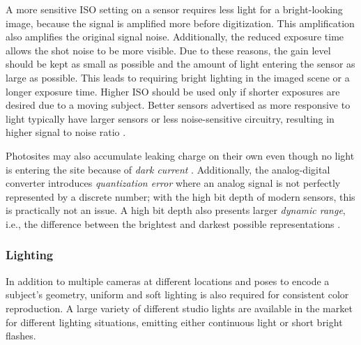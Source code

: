 A more sensitive ISO setting on a sensor requires less light for a bright-looking image, because the signal is amplified more before digitization.
This amplification also amplifies the original signal noise.
Additionally, the reduced exposure time allows the shot noise to be more visible.
Due to these reasons, the gain level should be kept as small as possible and the amount of light entering the sensor as large as possible.
This leads to requiring bright lighting in the imaged scene or a longer exposure time.
Higher ISO should be used only if shorter exposures are desired due to a moving subject.
Better sensors advertised as more responsive to light typically have larger sensors or less noise-sensitive circuitry, resulting in higher signal to noise ratio \cite{el2005cmos}.

Photosites may also accumulate leaking charge on their own even though no light is entering the site because of \emph{dark current} \cite{el2005cmos,litwiller2001ccd}.
Additionally, the analog-digital converter introduces \emph{quantization error} where an analog signal is not perfectly represented by a discrete number; with the high bit depth of modern sensors, this is practically not an issue.
A high bit depth also presents larger \emph{dynamic range}, i.e., the difference between the brightest and darkest possible representations \cite{el2005cmos,litwiller2001ccd}.


\subsubsection{Lighting} \label{sec:bg-lighting} %

In addition to multiple cameras at different locations and poses to encode a subject's geometry, uniform and soft lighting is also required for consistent color reproduction.
A large variety of different studio lights are available in the market for different lighting situations, emitting either continuous light or short bright flashes.



